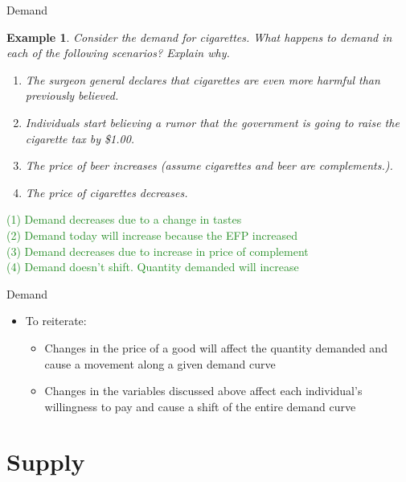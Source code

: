 \documentclass[xcolor={dvipsnames},pdf, hyperref={colorlinks=true, citecolor=ForestGreen, linkcolor=BlueViolet, urlcolor=Magenta}]{beamer}
\newtheorem{exmp}{Example}[section]
\theoremstyle{definition}
\newcommand{\ddp}[1]{{\textcolor{ForestGreen}{#1}}}
\begin{document}
\begin{frame}[t]{Demand}
	\begin{exmp}
		\small
		Consider the demand for cigarettes. What happens to demand in each of the following scenarios? Explain why.
		\begin{enumerate}
			\item	The surgeon general declares that cigarettes are even more harmful than previously believed.
			

			\item	Individuals start believing a rumor that the government is going to raise the cigarette tax by \$1.00.
			
		
			
			\item 	The price of beer increases (assume cigarettes and beer are complements.). 
			
			
			
			\item The price of cigarettes decreases.  
			
		\end{enumerate}
	\end{exmp}


\ddp{\pause \small (1) Demand decreases due to a change in tastes \\
\pause (2) Demand today will increase because the EFP increased \\
\pause (3) Demand decreases due to increase in price of complement \\
\pause (4) Demand doesn't shift. Quantity demanded will increase}
\end{frame}



	
\begin{frame}{Demand}
	\begin{itemize}
		\item To reiterate:
		\begin{itemize}
			\item Changes in the price of a good will affect the quantity demanded and cause a movement along a given demand curve
			\item Changes in the variables discussed above affect each individual's willingness to pay and cause a shift of the entire demand curve
		\end{itemize}
	\end{itemize}
\end{frame}

\section{Supply}
\end{document}
